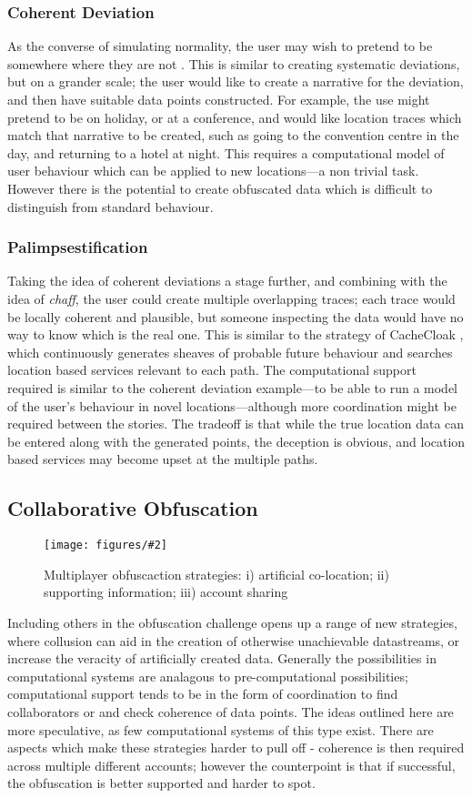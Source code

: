 \documentclass{IOS-Book-Article}     %
\newcommand{\fig}[3][0.9]{
\begin{figure}[tp]
\begin{center}
\texttt{[image: figures/\#2]}
\caption{#3}
\label{fig:#2}
\end{center}
\end{figure}
}
\newcommand{\tbox}[3][red]{{
\color{#1}\noindent{
   \fbox{\scriptsize{ {\bf #2} \textsl{#3}}}
   \vspace{2pt}
}
}}
\newcommand{\todo}[1]{\tbox{TODO:}{#1}}
\begin{document}
\subsubsection{Coherent Deviation}
As the converse of simulating normality, the user may wish to pretend to be
somewhere where they are not \todo{more motivation for Alibot!}. This is similar
to creating systematic deviations, but on a grander scale; the user would like
to create a narrative for the deviation, and then have suitable data points
constructed. For example, the use might pretend to be on holiday, or at a
conference, and would like location traces which match that narrative to be
created, such as going to the convention centre in the day, and returning to a
hotel at night. This requires a computational model of user behaviour which can
be applied to new locations---a non trivial task. However there is the potential
to create obfuscated data which is difficult to distinguish from standard
behaviour. \todo{examples}

\subsubsection{Palimpsestification}
Taking the idea of coherent deviations a stage further, and combining with the
idea of \emph{chaff}, the user could create multiple overlapping traces; each
trace would be locally coherent and plausible, but someone inspecting the data would have no way to know which is the real one.
This is similar to the strategy of CacheCloak \todo{reference}, which
continuously generates sheaves of probable future behaviour and searches
location based services relevant to each  path. The computational support
required is similar to the coherent deviation example---to be able to run a
model of the user's behaviour in novel locations---although more coordination
might be required between the stories. The tradeoff is that while the true
location data can be entered along with the generated points, the deception is
obvious, and location based services may become upset at the multiple paths.

\subsection{Collaborative Obfuscation}
\fig{MultiPlayerObfuscation}{Multiplayer obfuscaction strategies: i) artificial
co-location; ii) supporting information; iii) account sharing}

Including others in the obfuscation challenge opens up a range of new 
strategies, where collusion can aid in the creation of otherwise unachievable
datastreams, or increase the veracity of artificially created data. Generally
the possibilities in computational systems are analagous to pre-computational
possibilities; computational support tends to be in the form of coordination to
find collaborators or and check coherence of data points. The ideas outlined
here are more speculative, as few computational systems of this type exist.
There are aspects which make these strategies harder to pull off - coherence is
then required across multiple different accounts; however the counterpoint is
that if successful, the obfuscation is better supported and harder to spot.
\end{document}
